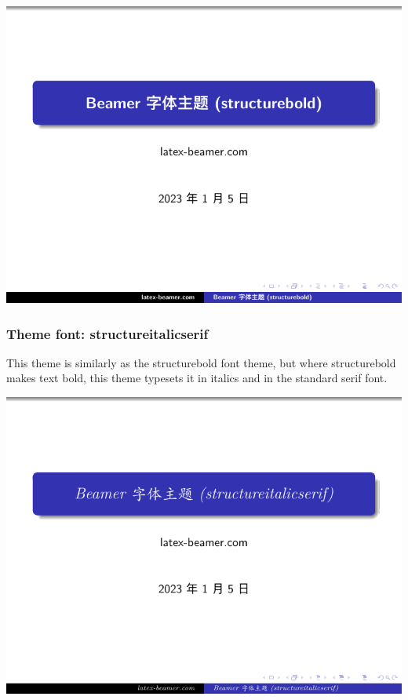 \includegraphics[page=2]{examples/beamer/font-theme-structurebold.pdf}

\subsubsection{Theme font: {\ttfamily structureitalicserif}}

This theme is similarly as the structurebold font theme, but where structurebold makes text bold, this theme typesets it in italics and in the
standard serif font.

\includegraphics[page=1]{examples/beamer/font-theme-structureitalicserif.pdf}

